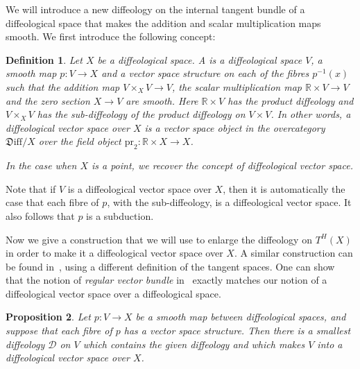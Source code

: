 \documentclass[12pt]{amsart}
\newcommand{\dfn}[1]{\textbf{\boldmath{#1}}}
\newtheorem{de}{Definition}[section]
\newtheorem{prop}[de]{Proposition}
\theoremstyle{remark}
\newcommand{\ra}{\to}
\newcommand{\Diff}{{\mathfrak{D}\mathrm{iff}}}
\newcommand{\cD}{{\mathcal{D}}}
\newcommand{\pr}{{\mathrm{pr}}}
\def \R{\mathbb{R}}
\begin{document}
We will introduce a new diffeology on the internal tangent bundle of a diffeological space
that makes the addition and scalar multiplication maps smooth.
We first introduce the following concept:

\begin{de}
Let $X$ be a diffeological space.
A \dfn{diffeological vector space over $X$} is a diffeological space $V$,
a smooth map $p : V \to X$
and a vector space structure on each of the
fibres $p^{-1}(x)$ such that the addition map $V \times_X V \to V$,
the scalar multiplication map $\R \times V \to V$
and the zero section $X \ra V$ are smooth.
Here $\R \times V$ has the product diffeology
and $V \times_X V$ has the sub-diffeology of the product diffeology on $V \times V$.
In other words, a diffeological vector space over $X$ is
a vector space object in the overcategory $\Diff/X$
over the field object $\pr_2: \R \times X \to X$.

In the case when $X$ is a point, we recover the concept of diffeological vector space.
\end{de}

Note that if $V$ is a diffeological vector space over $X$, then it
is automatically the case that each fibre of $p$, with the sub-diffeology,
is a diffeological vector space.
It also follows that $p$ is a subduction.

\medskip

Now we give a construction that we will use to enlarge the
diffeology on $T^H(X)$ in order to make it a diffeological
vector space over $X$.
A similar construction can be found in~\cite[Theorem~5.1.6 and Definition~6.2.1]{V},
using a different definition of the tangent spaces.
One can show that the notion of \emph{regular vector bundle} in~\cite{V}
exactly matches our notion of a diffeological vector space over a
diffeological space.
%

\begin{prop}\label{prop:dvs-over-X}
Let $p:V \to X$ be a smooth map between diffeological spaces, and
suppose that each fibre of $p$ has a vector space structure.  Then there
is a smallest diffeology $\cD$ on $V$ which contains the given diffeology
and which makes $V$ into a diffeological vector space over $X$.
\end{prop}
\end{document}
